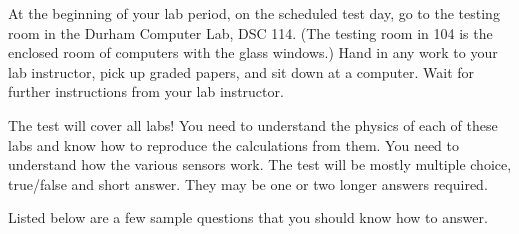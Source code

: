 \documentclass[main.tex]{subfiles}
\begin{document}
At the beginning of your lab period, on the scheduled test day, go to the testing room in the Durham Computer Lab, DSC 114. (The testing room in 104 is the enclosed room of computers with the glass windows.) Hand in any work to your lab instructor, pick up graded papers, and sit down at a computer. Wait for further instructions from your lab instructor.

The test will cover all labs! You need to understand the physics of each of these labs and know how to reproduce the calculations from them. You need to understand how the various sensors work. The test will be mostly multiple choice, true/false and short answer. They may be one or two longer answers required.

Listed below are a few sample questions that you should know how to answer.
\end{document}
